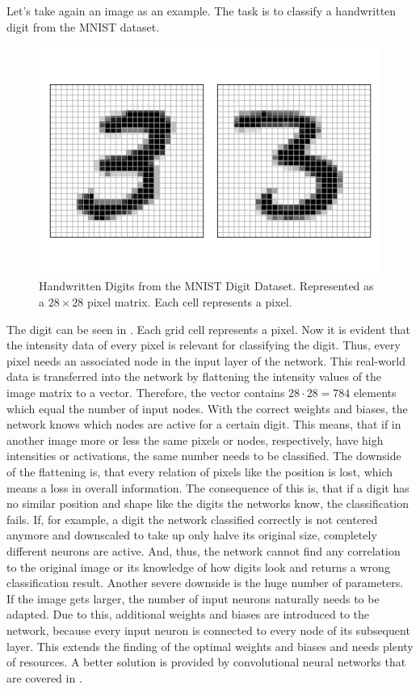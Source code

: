 Let's take again an image as an example.
The task is to classify a handwritten digit from the MNIST dataset\cite{Lecun98}.
\begin{figure}
	\centering
	\includegraphics[width=.8\textwidth]{images/mnist-digit}
	\caption[Handwritten digits from the MNIST digit dataset]{Handwritten Digits from the MNIST Digit Dataset. Represented as a $28 \times 28$ pixel matrix. Each cell represents a pixel.}
	\label{fig:mnist-digit}
\end{figure}
The digit can be seen in .
Each grid cell represents a pixel.
Now it is evident that the intensity data of every pixel is relevant for classifying the digit.
Thus, every pixel needs an associated node in the input layer of the network.
This real-world data is transferred into the network by flattening the intensity values of the image matrix to a vector.
Therefore, the vector contains $28 \cdot 28 = 784$ elements which equal the number of input nodes.
With the correct weights and biases, the network knows which nodes are active for a certain digit.
This means, that if in another image more or less the same pixels or nodes, respectively, have high intensities or activations, the same number needs to be classified.
The downside of the flattening is, that every relation of pixels like the position is lost, which means a loss in overall information.
The consequence of this is, that if a digit has no similar position and shape like the digits the networks know, the classification fails.
If, for example, a digit the network classified correctly is not centered anymore and downscaled to take up only halve its original size, completely different neurons are active.
And, thus, the network cannot find any correlation to the original image or its knowledge of how digits look and returns a wrong classification result.
Another severe downside is the huge number of parameters.
If the image gets larger, the number of input neurons naturally needs to be adapted.
Due to this, additional weights and biases are introduced to the network, because every input neuron is connected to every node of its subsequent layer.
This extends the finding of the optimal weights and biases and needs plenty of resources.
A better solution is provided by convolutional neural networks that are covered in .
